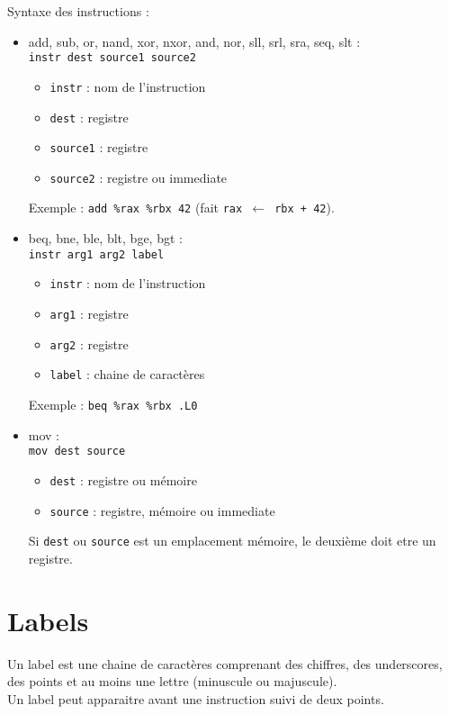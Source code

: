 \documentclass[a4paper]{article}
\begin{document}
    Syntaxe des instructions :
    \begin{itemize}
        \item add, sub, or, nand, xor, nxor, and, nor, sll, srl, sra, seq, slt :\\
        \texttt{instr dest source1 source2}
        \begin{itemize}
            \item \texttt{instr} : nom de l'instruction
            \item \texttt{dest} : registre
            \item \texttt{source1} : registre
            \item \texttt{source2} : registre ou immediate
        \end{itemize}
        Exemple : \texttt{add \%rax \%rbx 42} 
        (fait \texttt{rax $\leftarrow$ rbx + 42}).
        \item beq, bne, ble, blt, bge, bgt :\\
        \texttt{instr arg1 arg2 label}
        \begin{itemize}
            \item \texttt{instr} : nom de l'instruction
            \item \texttt{arg1} : registre
            \item \texttt{arg2} : registre
            \item \texttt{label} : chaine de caractères 
        \end{itemize}
        Exemple : \texttt{beq \%rax \%rbx .L0} 
        \item mov :\\
        \texttt{mov dest source}
        \begin{itemize}
            \item \texttt{dest} : registre ou mémoire
            \item \texttt{source} : registre, mémoire ou immediate
        \end{itemize}
        Si \texttt{dest} ou \texttt{source} est un emplacement mémoire, le deuxième doit etre un registre.
    \end{itemize}

    \section{Labels}
    Un label est une chaine de caractères comprenant des chiffres, 
    des underscores, des points et au moins une lettre (minuscule ou majuscule).\\
    Un label peut apparaitre avant une instruction suivi de deux points.
\end{document}
